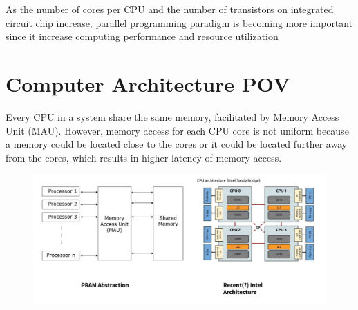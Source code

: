 \documentclass[12pt]{article}
\begin{document}
\MakeScribeTop

 As the number of cores per CPU and the number of transistors on integrated circuit chip increase, parallel programming paradigm is becoming more important since it increase computing performance and resource utilization
\section{Computer Architecture POV}
Every CPU in a system share the same memory, facilitated by Memory Access Unit (MAU). However, memory access for each CPU core is not uniform because a memory could be located close to the cores or it could be located further away from the cores, which results in higher latency of memory access.
\begin{figure}[h]
  \centering
  \includegraphics[scale=0.5]{parallel-architecture.png}
\end{figure}
\end{document}
